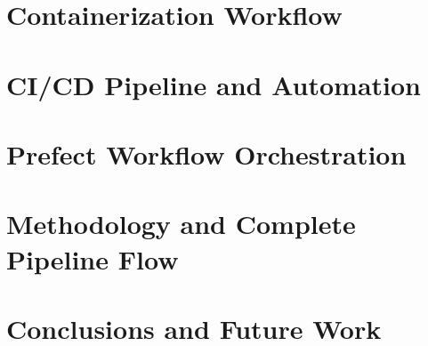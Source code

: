\documentclass[10pt,conference,a4paper]{IEEEtran}
\begin{document}
\section{Containerization Workflow}


\section{CI/CD Pipeline and Automation}


\section{Prefect Workflow Orchestration}


\section{Methodology and Complete Pipeline Flow}


\section{Conclusions and Future Work}

\end{document}
